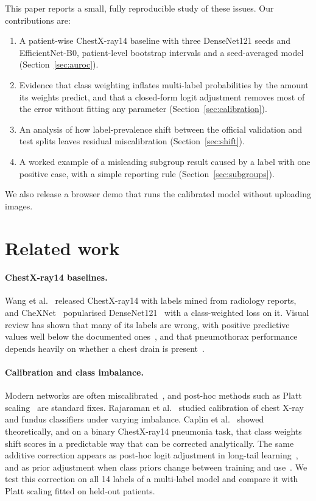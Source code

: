 \documentclass[11pt]{article}
\begin{document}
This paper reports a small, fully reproducible study of these issues. Our contributions are:
\begin{enumerate}
  \item A patient-wise ChestX-ray14 baseline with three DenseNet121 seeds and EfficientNet-B0, patient-level bootstrap intervals and a seed-averaged model (Section~\ref{sec:auroc}).
  \item Evidence that class weighting inflates multi-label probabilities by the amount its weights predict, and that a closed-form logit adjustment removes most of the error without fitting any parameter (Section~\ref{sec:calibration}).
  \item An analysis of how label-prevalence shift between the official validation and test splits leaves residual miscalibration (Section~\ref{sec:shift}).
  \item A worked example of a misleading subgroup result caused by a label with one positive case, with a simple reporting rule (Section~\ref{sec:subgroups}).
\end{enumerate}
We also release a browser demo that runs the calibrated model without uploading images.

\section{Related work}

\paragraph{ChestX-ray14 baselines.} Wang et al.~\cite{wang2017chestxray8} released ChestX-ray14 with labels mined from radiology reports, and CheXNet~\cite{rajpurkar2017chexnet} popularised DenseNet121~\cite{huang2017densenet} with a class-weighted loss on it. Visual review has shown that many of its labels are wrong, with positive predictive values well below the documented ones~\cite{oakdenrayner2020exploring}, and that pneumothorax performance depends heavily on whether a chest drain is present~\cite{oakdenrayner2020hidden}.

\paragraph{Calibration and class imbalance.} Modern networks are often miscalibrated~\cite{guo2017calibration}, and post-hoc methods such as Platt scaling~\cite{platt1999probabilistic} are standard fixes. Rajaraman et al.~\cite{rajaraman2022calibration} studied calibration of chest X-ray and fundus classifiers under varying imbalance. Caplin et al.~\cite{caplin2022calibrating} showed theoretically, and on a binary ChestX-ray14 pneumonia task, that class weights shift scores in a predictable way that can be corrected analytically. The same additive correction appears as post-hoc logit adjustment in long-tail learning~\cite{menon2021logit}, and as prior adjustment when class priors change between training and use~\cite{saerens2002adjusting}. We test this correction on all 14 labels of a multi-label model and compare it with Platt scaling fitted on held-out patients.
\end{document}
